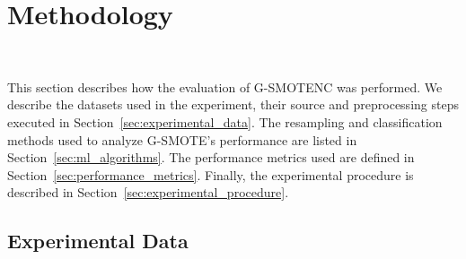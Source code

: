 \documentclass[preprint,12pt]{elsarticle}
\begin{document}
{\begin{algorithm}


\end{algorithm}


\section{Methodology}~\label{sec:methodology}

This section describes how the evaluation of G-SMOTENC was performed. We
describe the datasets used in the experiment, their source and preprocessing
steps executed in Section~\ref{sec:experimental_data}. The resampling and
classification methods used to analyze G-SMOTE's performance are listed in
Section~\ref{sec:ml_algorithms}. The performance metrics used are defined in
Section~\ref{sec:performance_metrics}. Finally, the experimental procedure is
described in Section~\ref{sec:experimental_procedure}.

\subsection{Experimental Data}~\label{sec:experimental_data}

}
\end{document}
